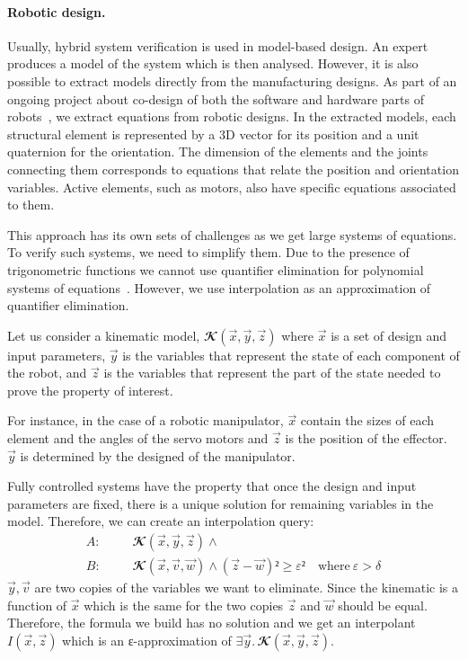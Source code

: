 
\paragraph{Robotic design.}
Usually, hybrid system verification is used in model-based design.
An expert produces a model of the system which is then analysed.
However, it is also possible to extract models directly from the manufacturing designs.
As part of an ongoing project about co-design of both the software and hardware parts of robots~\cite{react}, we extract equations from robotic designs.
In the extracted models, each structural element is represented by a 3D vector for its position and a unit quaternion for the orientation.
The dimension of the elements and the joints connecting them corresponds to equations that relate the position and orientation variables.
Active elements, such as motors, also have specific equations associated to them.

This approach has its own sets of challenges as we get large systems of equations.
To verify such systems, we need to simplify them.
Due to the presence of trigonometric functions we cannot use quantifier elimination for polynomial systems of equations~\cite{qepcad}.
However, we use interpolation as an approximation of quantifier elimination.

Let us consider a kinematic model, $𝓚(\vec x,\vec y,\vec z)$ where $\vec x$ is a set of design and input parameters, $\vec y$ is the variables that represent the state of each component of the robot, and $\vec z$ is the variables that represent the part of the state needed to prove the property of interest.

For instance, in the case of a robotic manipulator, $\vec x$ contain the sizes of each element and the angles of the servo motors and $\vec z$ is the position of the effector.
$\vec y$ is determined by the designed of the manipulator.

Fully controlled systems have the property that once the design and input parameters are fixed, there is a unique solution for remaining variables in the model.
Therefore, we can create an interpolation query:
\begin{eqnarray*}
A: &~~~~ &  𝓚(\vec x,\vec y,\vec z) ∧ \\
B: &~~~~ &  𝓚(\vec x,\vec v,\vec w) ∧ (\vec z-\vec w)² ≥ ε² \quad \text{where} ~ ε > δ
\end{eqnarray*}
$\vec y, \vec v$ are two copies of the variables we want to eliminate.
Since the kinematic is a function of $\vec x$ which is the same for the two copies $\vec z$ and $\vec w$ should be equal.
Therefore, the formula we build has no solution and we get an interpolant $I(\vec x,\vec z)$ which is an ε-approximation of $∃ \vec y.\,𝓚(\vec x,\vec y,\vec z)$.

